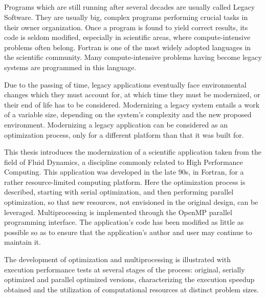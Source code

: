 \ \\
\ \\
\label{pagsumm}
\\
\ \\

Programs which are still running after several decades are usually called Legacy Software. They are usually big, complex programs performing crucial tasks in their owner organization. Once a program is found to yield correct results, its code is seldom modified, especially in scientific areas, where compute-intensive problems often belong. Fortran is one of the most widely adopted languages in the scientific community. Many compute-intensive problems having become legacy systems are programmed in this language.

Due to the passing of time, legacy applications eventually face environmental changes which they must account for, at which time they must be modernized, or their end of life has to be considered. Modernizing a legacy system entails a work of a variable size, depending on the system's complexity and the new proposed environment. Modernizing a legacy application can be considered as an optimization process, only for a different platform than that it was built for.

This thesis introduces the modernization of a scientific application taken from the field of Fluid Dynamics, a discipline commonly related to High Performance Computing. This application was developed in the late 90s, in Fortran, for a rather resource-limited computing platform. Here the optimization process is described, starting with serial optimization, and then performing parallel optimization, so that new resources, not envisioned in the original design, can be leveraged. Multiprocessing is implemented through the OpenMP parallel programming interface. The application's code has been modified as little as possible so as to ensure that the application's author and user may continue to maintain it.

The development of optimization and multiprocessing is illustrated with execution performance tests at several stages of the process: original, serially optimized and parallel optimized versions, characterizing the execution speedup obtained and the utilization of computational resources at distinct problem sizes.

\vfill
\pagebreak
